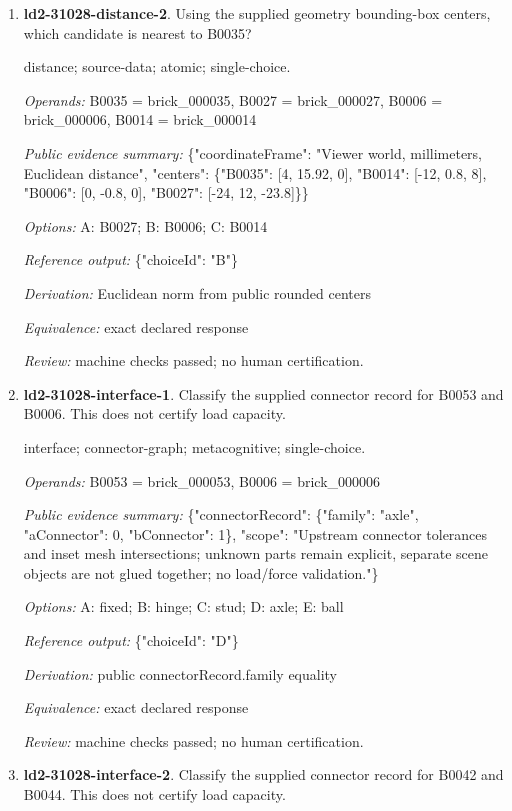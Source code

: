 \begin{enumerate}
\item \textbf{ld2-31028-distance-2}. Using the supplied geometry bounding-box centers, which candidate is nearest to B0035?
\par{\small distance; source-data; atomic; single-choice.\par\textit{Operands:} B0035 = brick\_000035, B0027 = brick\_000027, B0006 = brick\_000006, B0014 = brick\_000014\par\textit{Public evidence summary:} \{"coordinateFrame": "Viewer world, millimeters, Euclidean distance", "centers": \{"B0035": [4, 15.92, 0], "B0014": [-12, 0.8, 8], "B0006": [0, -0.8, 0], "B0027": [-24, 12, -23.8]\}\}\par\textit{Options:} A: B0027; B: B0006; C: B0014\par\textit{Reference output:} \{"choiceId": "B"\}\par\textit{Derivation:} Euclidean norm from public rounded centers\par\textit{Equivalence:} exact declared response\par\textit{Review:} machine checks passed; no human certification.}
\item \textbf{ld2-31028-interface-1}. Classify the supplied connector record for B0053 and B0006. This does not certify load capacity.
\par{\small interface; connector-graph; metacognitive; single-choice.\par\textit{Operands:} B0053 = brick\_000053, B0006 = brick\_000006\par\textit{Public evidence summary:} \{"connectorRecord": \{"family": "axle", "aConnector": 0, "bConnector": 1\}, "scope": "Upstream connector tolerances and inset mesh intersections; unknown parts remain explicit, separate scene objects are not glued together; no load/force validation."\}\par\textit{Options:} A: fixed; B: hinge; C: stud; D: axle; E: ball\par\textit{Reference output:} \{"choiceId": "D"\}\par\textit{Derivation:} public connectorRecord.family equality\par\textit{Equivalence:} exact declared response\par\textit{Review:} machine checks passed; no human certification.}
\item \textbf{ld2-31028-interface-2}. Classify the supplied connector record for B0042 and B0044. This does not certify load capacity.

\end{enumerate}
